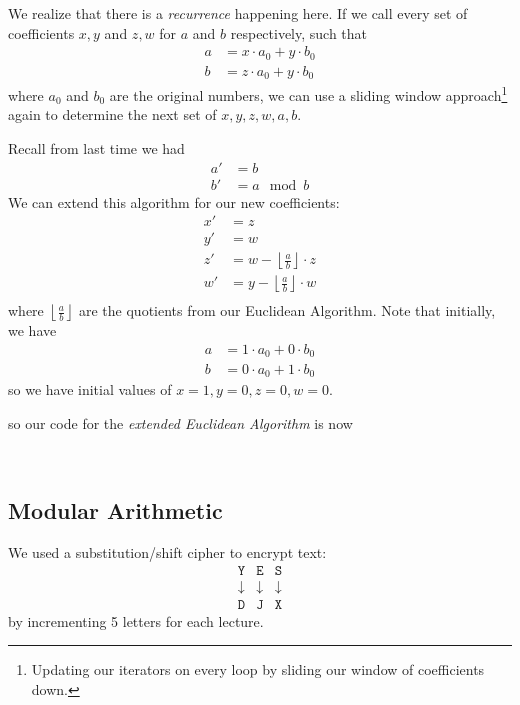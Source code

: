 We realize that there is a \emph{recurrence} happening here. If we call every set of coefficients $x, y$ and $z, w$ for $a$ and $b$ respectively, such that
\begin{align*}
    a & = x\cdot a_0 + y\cdot b_0 \\
    b & = z\cdot a_0 + y\cdot b_0
\end{align*}
where $a_0$ and $b_0$ are the original numbers, we can use a sliding window approach\footnote{Updating our iterators on every loop by sliding our window of coefficients down.} again to determine the next set of $x, y, z, w, a, b$.

Recall from last time we had
\begin{align*}
    a' & = b       \\
    b' & = a\mod b
\end{align*}
We can extend this algorithm for our new coefficients:
\begin{align*}
    x' & = z                                               \\
    y' & = w                                               \\
    z' & = w - \left\lfloor\frac{a}{b}\right\rfloor\cdot z \\
    w' & = y - \left\lfloor\frac{a}{b}\right\rfloor\cdot w \\
\end{align*}
where $\left\lfloor\frac{a}{b}\right\rfloor$ are the quotients from our Euclidean Algorithm. Note that initially, we have
\begin{align*}
    a & = 1\cdot a_0 + 0\cdot b_0 \\
    b & = 0\cdot a_0 + 1\cdot b_0
\end{align*}
so we have initial values of $x=1, y=0, z=0, w=0$.

so our code for the \emph{extended Euclidean Algorithm} is now
\begin{algorithm}
    ~
\end{algorithm}

\subsection{Modular Arithmetic}
\recall We used a substitution/shift cipher to encrypt text:
\[\begin{array}{ccc}
        \mathtt{Y} & \mathtt{E} & \mathtt{S} \\
        \downarrow & \downarrow & \downarrow \\
        \mathtt{D} & \mathtt{J} & \mathtt{X}
    \end{array}\]
by incrementing 5 letters for each lecture.

